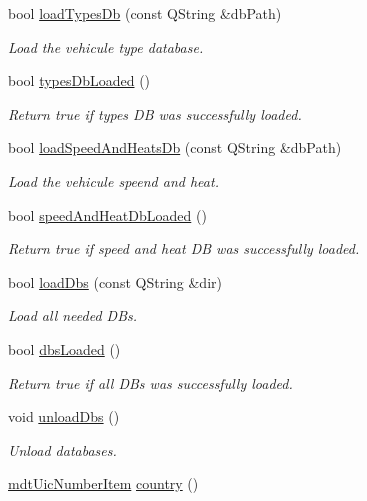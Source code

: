 \begin{DoxyCompactItemize}
bool \hyperlink{classmdt_uic_number_a98c879c7bb7412caac4612a46586b76d}{load\-Types\-Db} (const Q\-String \&db\-Path)
\begin{DoxyCompactList}\small\item\em Load the vehicule type database. \end{DoxyCompactList}\item 
bool \hyperlink{classmdt_uic_number_a39fb254207bfe6dd6eaade2711030dac}{types\-Db\-Loaded} ()
\begin{DoxyCompactList}\small\item\em Return true if types D\-B was successfully loaded. \end{DoxyCompactList}\item 
bool \hyperlink{classmdt_uic_number_ab1d08c2ea34f310631866d2e46010363}{load\-Speed\-And\-Heats\-Db} (const Q\-String \&db\-Path)
\begin{DoxyCompactList}\small\item\em Load the vehicule speend and heat. \end{DoxyCompactList}\item 
bool \hyperlink{classmdt_uic_number_a42ec71258e2120337953c8c6bda63638}{speed\-And\-Heat\-Db\-Loaded} ()
\begin{DoxyCompactList}\small\item\em Return true if speed and heat D\-B was successfully loaded. \end{DoxyCompactList}\item 
bool \hyperlink{classmdt_uic_number_ab7d29b1cb5fe5ac58bef5bec787e83df}{load\-Dbs} (const Q\-String \&dir)
\begin{DoxyCompactList}\small\item\em Load all needed D\-Bs. \end{DoxyCompactList}\item 
bool \hyperlink{classmdt_uic_number_ab684e8290b0a74a05e992699bf0fa7f4}{dbs\-Loaded} ()
\begin{DoxyCompactList}\small\item\em Return true if all D\-Bs was successfully loaded. \end{DoxyCompactList}\item 
void \hyperlink{classmdt_uic_number_a7bb368e5de6a9e7af3a2516eb4282e04}{unload\-Dbs} ()
\begin{DoxyCompactList}\small\item\em Unload databases. \end{DoxyCompactList}\item 
\hyperlink{classmdt_uic_number_item}{mdt\-Uic\-Number\-Item} \hyperlink{classmdt_uic_number_a69fea97b67a745980ad4386d5ffa9505}{country} ()

\end{DoxyCompactItemize}
